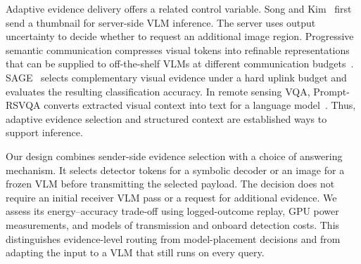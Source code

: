 Adaptive evidence delivery offers a related control variable.
Song and Kim~\cite{song2026collaborative} first send a thumbnail for
server-side VLM inference. The server uses output uncertainty to decide
whether to request an additional image region. Progressive semantic
communication compresses visual tokens into refinable representations
that can be supplied to off-the-shelf VLMs at different communication
budgets~\cite{hsu2026progressive}. SAGE~\cite{choi2026sage} selects
complementary visual evidence under a hard uplink budget and evaluates
the resulting classification accuracy. In remote sensing VQA,
Prompt-RSVQA converts extracted visual context into text for a language
model~\cite{chappuis2022promptrsvqa}. Thus, adaptive evidence selection
and structured context are established ways to support inference.

Our design combines sender-side evidence selection with a choice of
answering mechanism. It selects detector tokens for a symbolic decoder
or an image for a frozen VLM before transmitting the selected payload.
The decision does not require an initial receiver VLM pass or a request
for additional evidence. We assess its energy--accuracy trade-off using
logged-outcome replay, GPU power measurements, and models of transmission
and onboard detection costs. This distinguishes evidence-level routing
from model-placement decisions and from adapting the input to a VLM
that still runs on every query.
